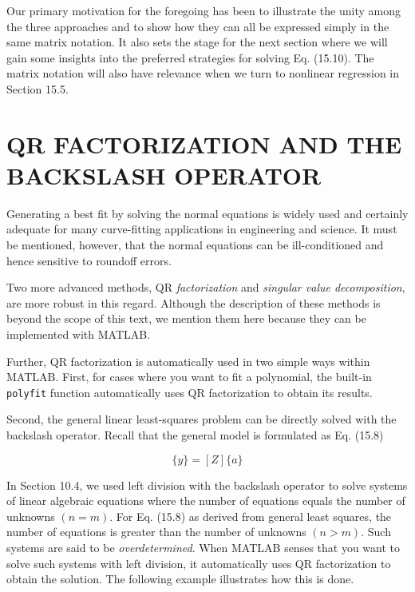 \documentclass[../main.tex]{subfiles}
\begin{document}
Our primary motivation for the foregoing has been to illustrate the unity among the
three approaches and to show how they can all be expressed simply in the same matrix notation. It also sets the stage for the next section where we will gain some insights into the
preferred strategies for solving Eq. (15.10). The matrix notation will also have relevance
when we turn to nonlinear regression in Section 15.5.

\bigskip
\label{cha:cha_P_15_4} %
\section{QR FACTORIZATION AND THE BACKSLASH OPERATOR}

\noindent Generating a best fit by solving the normal equations is widely used and certainly adequate
for many curve-fitting applications in engineering and science. 
It must be mentioned, however, that the normal equations can be ill-conditioned and hence sensitive to roundoff errors.

Two more advanced methods, QR \textit{factorization} and \textit{singular value decomposition}, are
more robust in this regard. Although the description of these methods is beyond the scope
of this text, we mention them here because they can be implemented with MATLAB.

Further, QR factorization is automatically used in two simple ways within MATLAB.
First, for cases where you want to fit a polynomial, the built-in \texttt{polyfit} function automatically uses QR factorization to obtain its results.

Second, the general linear least-squares problem can be directly solved with the backslash operator. Recall that the general model is formulated as Eq. (15.8)

\begin{equation}
	\tag{15.11}
	\{y\} = [Z] \{a\}
\end{equation}

In Section 10.4, we used left division with the backslash operator to solve systems of linear algebraic equations where the number of equations equals the number of unknowns $(n = m)$.
For Eq. (15.8) as derived from general least squares, the number of equations is greater than
the number of unknowns $(n > m)$. Such systems are said to be \textit{overdetermined}. When
MATLAB senses that you want to solve such systems with left division, it automatically uses
QR factorization to obtain the solution. The following example illustrates how this is done.
\end{document}

